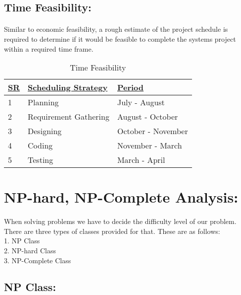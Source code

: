 \documentclass[11pt,a4paper]{report}
\begin{document}
\subsection{Time Feasibility:}
\paragraph{}Similar to economic feasibility, a rough estimate of the project schedule is required to determine if it would be feasible to complete the systems project within a required time frame.\\
\begin{table}[h]
\centering
\begin{tabular}{|l|l|l|}
\hline
{\ul \textbf{SR}} & {\ul \textbf{Scheduling Strategy}} & {\ul \textbf{Period}} \\ \hline
1                 & Planning                           & July - August         \\ \hline
2                 & Requirement Gathering              & August - October      \\ \hline
3                 & Designing                          & October - November    \\ \hline
4                 & Coding                             & November - March      \\ \hline
5                 & Testing                            & March - April         \\ \hline
\end{tabular}
\caption{Time Feasibility}
\end{table}

\section{NP-hard, NP-Complete Analysis:}
\paragraph{}When solving problems we have to decide the difficulty level of our problem. There are three types of classes provided for that. These are as follows:\\
1. NP Class\\
2. NP-hard Class\\
3. NP-Complete Class\\

\subsection{NP Class:}
\end{document}
